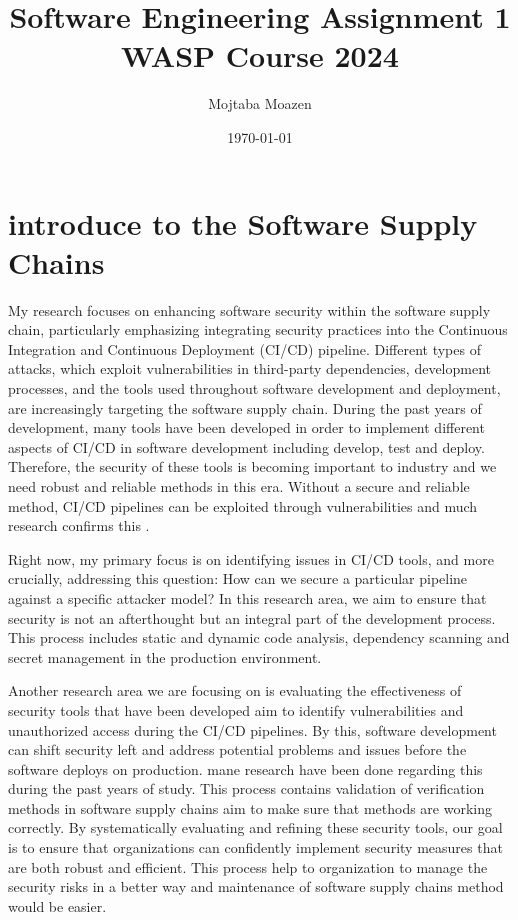 \documentclass[11pt]{article}
\title{Software Engineering Assignment 1\\
  WASP Course 2024
}
\author{Mojtaba Moazen}
\date{\today}
\begin{document}
\maketitle  
\section{introduce to the Software Supply Chains}
My research focuses on enhancing software security within the software supply chain, particularly emphasizing integrating security practices into the Continuous Integration and Continuous Deployment (CI/CD) pipeline. Different types of attacks, which exploit vulnerabilities in third-party dependencies, development processes, and the tools used throughout software development and deployment, are increasingly targeting the software supply chain.
During the past years of development, many tools have been developed in order to implement different aspects of CI/CD in software development including develop, test and deploy. Therefore, the security of these tools is becoming important to industry and we need robust and reliable methods in this era. Without a secure and reliable method, CI/CD pipelines can be exploited through vulnerabilities and much research confirms this \cite{281396}. 


Right now, my primary focus is on identifying issues in CI/CD tools, and more crucially, addressing this question: How can we secure a particular pipeline against a specific attacker model?
In this research area, we aim to ensure that security is not an afterthought but an integral part of the development process. This process includes static and dynamic code analysis, dependency scanning and secret management in the production environment.  

Another research area we are focusing on is evaluating the effectiveness of security tools that have been developed aim to identify vulnerabilities and unauthorized access during the CI/CD pipelines. By this, software development can shift security left and address potential problems and issues before the software deploys on production. mane research have been done regarding this during the past years of study. This process contains validation of verification methods in software supply chains aim to make sure that methods are working correctly. By systematically evaluating and refining these security tools, our goal is to ensure that organizations can confidently implement security measures that are both robust and efficient. This process help to organization to manage the security risks in a better way and maintenance of software supply chains method would be easier. 
\end{document}
